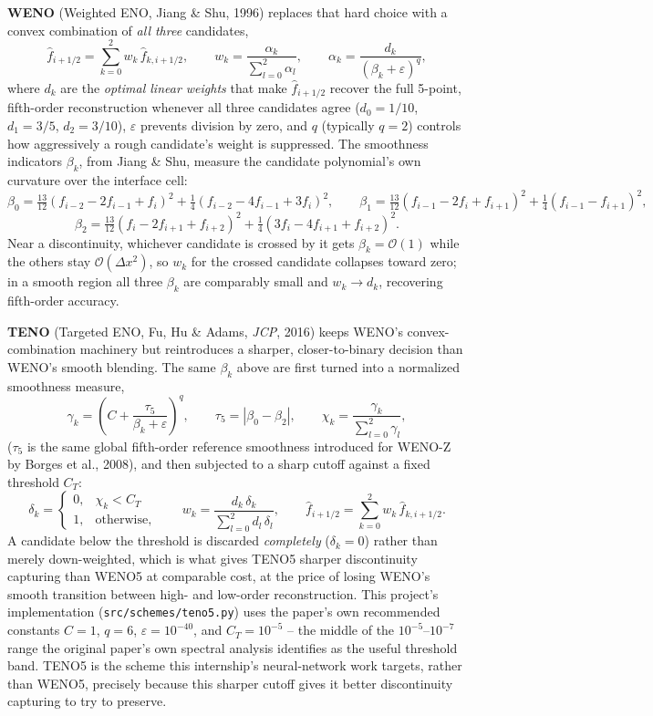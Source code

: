 \documentclass[11pt]{article}
\begin{document}
\textbf{WENO} (Weighted ENO, Jiang \& Shu, 1996) replaces that hard choice
with a convex combination of \emph{all three} candidates,
\[
\hat f_{i+1/2} = \sum_{k=0}^{2} w_k\, \hat f_{k,i+1/2}, \qquad
w_k = \frac{\alpha_k}{\sum_{l=0}^{2}\alpha_l}, \qquad
\alpha_k = \frac{d_k}{(\beta_k + \varepsilon)^{q}},
\]
where $d_k$ are the \emph{optimal linear weights} that make $\hat
f_{i+1/2}$ recover the full 5-point, fifth-order reconstruction whenever
all three candidates agree ($d_0 = 1/10$, $d_1 = 3/5$, $d_2 = 3/10$),
$\varepsilon$ prevents division by zero, and $q$ (typically $q=2$)
controls how aggressively a rough candidate's weight is suppressed. The
smoothness indicators $\beta_k$, from Jiang \& Shu, measure the candidate
polynomial's own curvature over the interface cell:
\[
\beta_0 = \tfrac{13}{12}(f_{i-2}-2f_{i-1}+f_i)^2 + \tfrac{1}{4}(f_{i-2}-4f_{i-1}+3f_i)^2, \qquad
\beta_1 = \tfrac{13}{12}(f_{i-1}-2f_i+f_{i+1})^2 + \tfrac{1}{4}(f_{i-1}-f_{i+1})^2,
\]
\[
\beta_2 = \tfrac{13}{12}(f_i-2f_{i+1}+f_{i+2})^2 + \tfrac{1}{4}(3f_i-4f_{i+1}+f_{i+2})^2.
\]
Near a discontinuity, whichever candidate is crossed by it gets
$\beta_k=\mathcal{O}(1)$ while the others stay $\mathcal{O}(\Delta x^2)$,
so $w_k$ for the crossed candidate collapses toward zero; in a smooth
region all three $\beta_k$ are comparably small and $w_k \to d_k$,
recovering fifth-order accuracy.

\textbf{TENO} (Targeted ENO, Fu, Hu \& Adams, \emph{JCP}, 2016) keeps
WENO's convex-combination machinery but reintroduces a sharper,
closer-to-binary decision than WENO's smooth blending. The same $\beta_k$
above are first turned into a normalized smoothness measure,
\[
\gamma_k = \left(C + \frac{\tau_5}{\beta_k+\varepsilon}\right)^{q},
\qquad
\tau_5 = |\beta_0 - \beta_2|,
\qquad
\chi_k = \frac{\gamma_k}{\sum_{l=0}^{2}\gamma_l},
\]
($\tau_5$ is the same global fifth-order reference smoothness introduced
for WENO-Z by Borges et al., 2008), and then subjected to a sharp cutoff
against a fixed threshold $C_T$:
\[
\delta_k = \begin{cases} 0, & \chi_k < C_T \\ 1, & \text{otherwise}, \end{cases}
\qquad
w_k = \frac{d_k\,\delta_k}{\sum_{l=0}^{2}d_l\,\delta_l},
\qquad
\hat f_{i+1/2} = \sum_{k=0}^{2} w_k\, \hat f_{k,i+1/2}.
\]
A candidate below the threshold is discarded \emph{completely}
($\delta_k=0$) rather than merely down-weighted, which is what gives TENO5
sharper discontinuity capturing than WENO5 at comparable cost, at the
price of losing WENO's smooth transition between high- and low-order
reconstruction. This project's implementation (\texttt{src/schemes/teno5.py}) uses the paper's own recommended constants $C=1$, $q=6$,
$\varepsilon=10^{-40}$, and $C_T=10^{-5}$ -- the middle of the
$10^{-5}$--$10^{-7}$ range the original paper's own spectral analysis
identifies as the useful threshold band. TENO5 is the scheme this
internship's neural-network work targets, rather than WENO5, precisely
because this sharper cutoff gives it better discontinuity capturing to
try to preserve.
\end{document}
